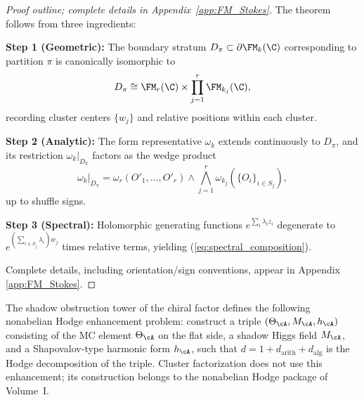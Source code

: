 \begin{proof}[Proof outline; complete details in Appendix~\ref{app:FM_Stokes}]
The theorem follows from three ingredients:

\textbf{Step 1 (Geometric):} The boundary stratum $D_\pi \subset \partial \FM_k(\C)$ corresponding to partition $\pi$ is canonically isomorphic to
\[
D_\pi \cong \FM_r(\C) \times \prod_{j=1}^r \FM_{k_j}(\C),
\]
recording cluster centers $\{w_j\}$ and relative positions within each cluster.

\textbf{Step 2 (Analytic):} The form representative $\omega_k$ extends continuously to $D_\pi$, and its restriction $\omega_k|_{D_\pi}$ factors as the wedge product
\[
\omega_k|_{D_\pi} = \omega_r(O'_1,\ldots,O'_r) \wedge \bigwedge_{j=1}^r \omega_{k_j}(\{O_i\}_{i \in S_j}),
\]
up to shuffle signs.

\textbf{Step 3 (Spectral):} Holomorphic generating functions $e^{\sum_i \lambda_i z_i}$ degenerate to $e^{(\sum_{i \in S_j} \lambda_i) w_j}$ times relative terms, yielding (\ref{eq:spectral_composition}).

Complete details, including orientation/sign conventions, appear in Appendix \ref{app:FM_Stokes}.
\end{proof}

\begin{remark}
\label{rem:nonabelian_hodge_shadow}
The shadow obstruction tower of the chiral factor defines the following
nonabelian Hodge enhancement problem: construct a triple
$(\Theta_\cA,M_\cA,h_\cA)$ consisting of the MC element
$\Theta_\cA$ on the flat side, a shadow Higgs field $M_\cA$, and a
Shapovalov-type harmonic form $h_\cA$, such that
$d=1+d_{\mathrm{arith}}+d_{\mathrm{alg}}$ is the Hodge decomposition of
the triple. Cluster factorization does not use this enhancement; its
construction belongs to the nonabelian Hodge package of Volume~I.
\end{remark}

